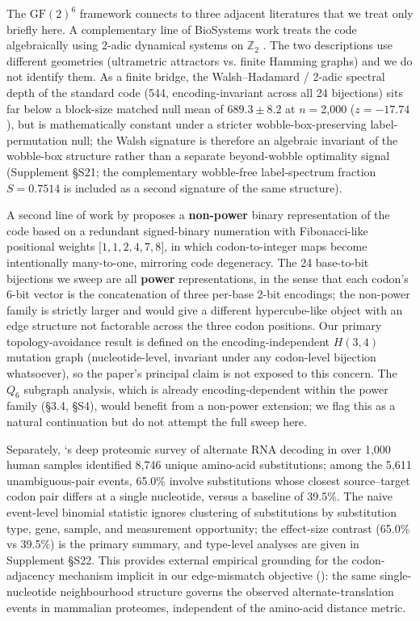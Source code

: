 \documentclass[preprint,11pt,authoryear,a4paper]{elsarticle}
\begin{document}
The \({\text{GF}(2)}^{6}\) framework connects to three adjacent
literatures that we treat only briefly here. A complementary line of
BioSystems work treats the code algebraically using 2-adic dynamical
systems on \(\mathbb{Z}_{2}\)
\citep{khrennikov2007, dragovich2019, axelsson2024a, axelsson2024b}. The
two descriptions use different geometries (ultrametric attractors vs.
finite Hamming graphs) and we do not identify them. As a finite bridge,
the Walsh--Hadamard / 2-adic spectral depth of the standard code (544,
encoding-invariant across all 24 bijections) sits far below a block-size
matched null mean of \(689.3 \pm 8.2\) at \(n =\)2,000
(\(z = - 17.74\)), but is mathematically constant under a stricter
wobble-box-preserving label-permutation null; the Walsh signature is
therefore an algebraic invariant of the wobble-box structure rather than
a separate beyond-wobble optimality signal (Supplement §S21; the
complementary wobble-free label-spectrum fraction \(S = 0.7514\) is
included as a second signature of the same structure).

A second line of work by \citep{gonzalez2016} proposes a
\textbf{non-power} binary representation of the code based on a
redundant signed-binary numeration with Fibonacci-like positional
weights \(\lbrack 1,1,2,4,7,8\rbrack\), in which codon-to-integer maps
become intentionally many-to-one, mirroring code degeneracy. The 24
base-to-bit bijections we sweep are all \textbf{power} representations,
in the sense that each codon's 6-bit vector is the concatenation of
three per-base 2-bit encodings; the non-power family is strictly larger
and would give a different hypercube-like object with an edge structure
not factorable across the three codon positions. Our primary
topology-avoidance result is defined on the encoding-independent
\(H(3,4)\) mutation graph (nucleotide-level, invariant under any
codon-level bijection whatsoever), so the paper's principal claim is not
exposed to this concern. The \(Q_{6}\) subgraph analysis, which is
already encoding-dependent within the power family (§3.4, §S4), would
benefit from a non-power extension; we flag this as a natural
continuation but do not attempt the full sweep here.

Separately, \citep{tsour2026}`s deep proteomic survey of alternate RNA
decoding in over 1,000 human samples identified 8,746 unique amino-acid
substitutions; among the 5,611 unambiguous-pair events, 65.0\% involve
substitutions whose closest source--target codon pair differs at a
single nucleotide, versus a baseline of 39.5\%. The naive event-level
binomial statistic ignores clustering of substitutions by substitution
type, gene, sample, and measurement opportunity; the effect-size
contrast (65.0\% vs 39.5\%) is the primary summary, and type-level
analyses are given in Supplement §S22. This provides external empirical
grounding for the codon-adjacency mechanism implicit in our
edge-mismatch objective (): the same
single-nucleotide neighbourhood structure governs the observed
alternate-translation events in mammalian proteomes, independent of the
amino-acid distance metric.
\end{document}
